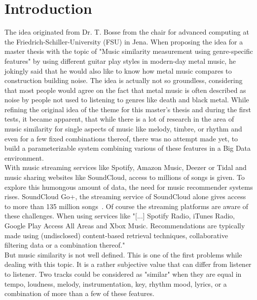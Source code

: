 \chapter{Introduction}\label{intro}

The idea originated from Dr. T. Bosse from the chair for advanced computing at the Friedrich-Schiller-University (FSU) in Jena. When proposing the idea for a master thesis with the topic of "Music similarity measurement using genre-specific features" by using different guitar play styles in modern-day metal music, he jokingly said that he would also like to know how metal music compares to construction building noise. The idea is actually not so groundless, considering that most people would agree on the fact that metal music is often described as noise by people not used to listening to genres like death and black metal.
While refining the original idea of the theme for this master's thesis and during the first tests, it became apparent, that while there is a lot of research in the area of music similarity for single aspects of music like melody, timbre, or rhythm and even for a few fixed combinations thereof, there was no attempt made yet, to build a parameterizable system combining various of these features in a Big Data environment.\\
With music streaming services like Spotify, Amazon Music, Deezer or Tidal and music sharing websites like SoundCloud, access to millions of songs is given. To explore this humongous amount of data, the need for music recommender systems rises. SoundCloud Go+, the streaming service of SoundCloud alone gives access to more than 135 million songs~\cite{soundcloudgo}. 
Of course the streaming platforms are aware of these challenges. When using services like "[...] Spotify Radio, iTunes Radio, Google Play Access All Areas and Xbox Music. Recommendations are typically made using (undisclosed) content-based retrieval techniques, collaborative filtering data or a combination thereof."~\cite[p. 9]{knees1}\\
But music similarity is not well defined. This is one of the first problems while dealing with this topic. It is a rather subjective value that can differ from listener to listener. Two tracks could be considered as "similar" when they are equal in tempo, loudness, melody, instrumentation, key, rhythm mood, lyrics, or a combination of more than a few of these features.\\
\ \\
